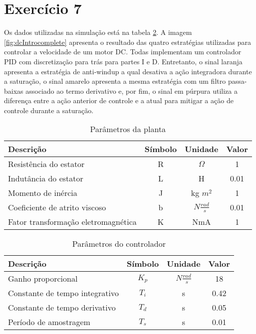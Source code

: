 \section*{Exercício 7}

Os dados utilizadas na simulação está na tabela \ref{tab:ex7}. A imagem \ref{fig:dcIntrocomplete} apresenta o resultado das quatro estratégias utilizadas para controlar a velocidade de um motor DC. Todas implementam um controlador PID com discretização para trás para partes I e D. Entretanto, o sinal laranja apresenta a estratégia de anti-windup a qual desativa a ação integradora durante a saturação, o sinal amarelo apresenta a mesma estratégia com um filtro passa-baixas associado ao termo derivativo e, por fim, o sinal em púrpura utiliza a diferença entre a ação anterior de controle e a atual para mitigar a ação de controle durante a saturação.

\begin{table}[H]
    \centering
    \begin{tabular}{|l|c|c|c|}
    \hline
    Descrição & Símbolo & Unidade & Valor \\ \hline
    Resistência do estator & R & $\Omega$ & 1 \\
    Indutância do estator & L & H & 0.01 \\
    Momento de inércia & J & kg $m^2$  & 1 \\
    Coeficiente de atrito viscoso & b & $N \frac{rad}{s}$ & 0.01 \\
    Fator transformação eletromagnética & K & NmA & 1 \hline
    \end{tabular}
    \caption{Parâmetros da planta}
    \label{tab:ex7}
\end{table}

\begin{table}[H]
    \centering
    \begin{tabular}{|l|c|c|c|}
    \hline
    Descrição & Símbolo & Unidade & Valor \\ \hline
    Ganho proporcional & $K_p$ & $N \frac{rad}{s}$ & 18 \\
    Constante de tempo integrativo & $T_i$ & s & 0.42 \\
    Constante de tempo derivativo & $T_d$ & s  & 0.05 \\
    Período de amostragem & $T_s$ & s & 0.01 \hline
    \end{tabular}
    \caption{Parâmetros do controlador}
    \label{tab:ex7}
\end{table}

